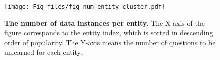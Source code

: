 \begin{figure}[h]
 \centering
  \texttt{[image: Fig\_files/fig\_num\_entity\_cluster.pdf]}
  \caption{\textbf{The number of data instances per entity.} The X-axis of the figure corresponds to the entity index, which is sorted in descending order of popularity. The Y-axis means the number of questions to be unlearned for each entity.}
  \label{num_entity_cluster}
\end{figure}

